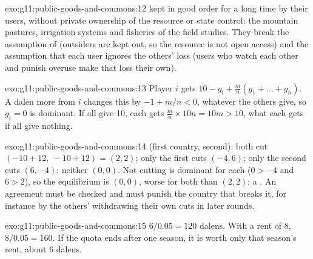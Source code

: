 \begin{solution}{exo:g11:public-goods-and-commons:12}
 kept in good order for a long time by their users, without private ownership of the resource or state control: the mountain pastures, irrigation systems and
fisheries of the field studies. They break the assumption of  (outsiders are kept out, so the resource is not open access) and the assumption that each user ignores
the others' loss (users who watch each other and punish overuse make that loss their own).
\end{solution}

\begin{solution}{exo:g11:public-goods-and-commons:13}
Player $i$ gets $10 - g_i + \frac{m}{n}(g_1 + \dots + g_n)$. A dalen more from $i$ changes this by $-1 + m/n < 0$, whatever the others give, so $g_i = 0$ is dominant. If all
give 10, each gets $\frac{m}{n} \times 10n = 10m > 10$, what each gets if all give nothing.
\end{solution}

\begin{solution}{exo:g11:public-goods-and-commons:14}
 (first country, second): both cut $(-10 + 12,\ -10 + 12) = (2, 2)$; only the first cuts $(-4, 6)$; only the second cuts $(6, -4)$; neither $(0, 0)$. Not cutting is
dominant for each ($0 > -4$ and $6 > 2$), so the equilibrium is $(0, 0)$, worse for both than $(2, 2)$: a . An agreement must be checked and must punish
the country that breaks it, for instance by the others' withdrawing their own cuts in later rounds.
\end{solution}

\begin{solution}{exo:g11:public-goods-and-commons:15}
$6/0.05 = 120$ dalens. With a rent of 8, $8/0.05 = 160$. If the quota ends after one season, it is worth only that season's rent, about 6 dalens.
\end{solution}

